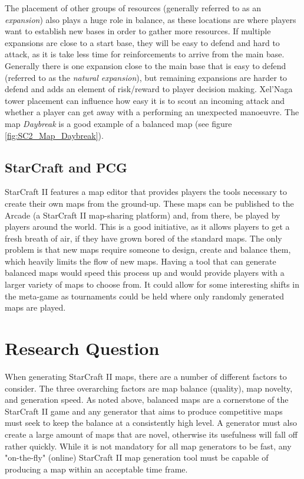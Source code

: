 The placement of other groups of resources (generally referred to as an \textit{expansion}) also plays a huge role in balance, as these locations are where players want to establish new bases in order to gather more resources. If multiple expansions are close to a start base, they will be easy to defend and hard to attack, as it is take less time for reinforcements to arrive from the main base. Generally there is one expansion close to the main base that is easy to defend (referred to as the \textit{natural expansion}), but remaining expansions are harder to defend and adds an element of risk/reward to player decision making. Xel'Naga tower placement can influence how easy it is to scout an incoming attack and whether a player can get away with a performing an unexpected manoeuvre. The map \textit{Daybreak} is a good example of a balanced map (see figure \ref{fig:SC2_Map_Daybreak}).


\subsection{StarCraft and PCG}
\label{introduction_starcraft_pcg}
StarCraft II features a map editor that provides players the tools necessary to create their own maps from the ground-up. These maps can be published to the Arcade\cite{starcraftarcade} (a StarCraft II map-sharing platform) and, from there, be played by players around the world. This is a good initiative, as it allows players to get a fresh breath of air, if they have grown bored of the standard maps. The only problem is that new maps require someone to design, create and balance them, which heavily limits the flow of new maps. Having a tool that can generate balanced maps would speed this process up and would provide players with a larger variety of maps to choose from. It could allow for some interesting shifts in the meta-game as tournaments could be held where only randomly generated maps are played. 

\section{Research Question}
\label{introduction_researchquestion}
When generating StarCraft II maps, there are a number of different factors to consider. The three overarching factors are map balance (quality), map novelty, and generation speed. As noted above, balanced maps are a cornerstone of the StarCraft II game and any generator that aims to produce competitive maps must seek to keep the balance at a consistently high level. A generator must also create a large amount of maps that are novel, otherwise its usefulness will fall off rather quickly. While it is not mandatory for all map generators to be fast, any "on-the-fly" (online) StarCraft II map generation tool must be capable of producing a map within an acceptable time frame.

